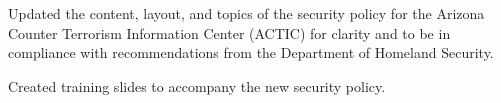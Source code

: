 


\begin{rExperience}

  \item Updated the content, layout, and topics of the security policy for the Arizona Counter Terrorism Information Center (ACTIC) for clarity and to be in compliance with recommendations from the Department of Homeland Security.

  \item Created training slides to accompany the new security policy.

\end{rExperience}

